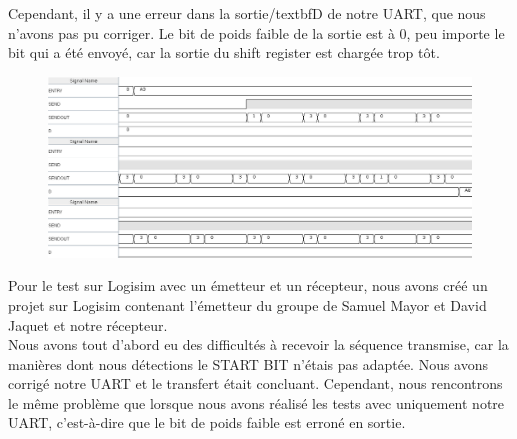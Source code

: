 \documentclass[a4paper]{article} %
\begin{document}
\begin{tcolorbox}[colframe=Monokaimagenta,colback=white]

Cependant, il y a une erreur dans la sortie/textbf{D} de notre UART, que nous n'avons pas pu corriger. Le bit de poids faible de la sortie est à 0, peu importe le bit qui a été envoyé, car la sortie du shift register est chargée trop tôt.\\
\begin{figure}[H]
\centering
    \includegraphics[width=1\textwidth]{src/CHRONO_EMISSION.png}
    \label{fig:chrono_emetteur}
\end{figure}
Pour le test sur Logisim avec un émetteur et un récepteur, nous avons créé un projet sur Logisim contenant l'émetteur du groupe de Samuel Mayor et David Jaquet et notre récepteur.\\
Nous avons tout d'abord eu des difficultés à recevoir la séquence transmise, car la manières dont nous détections le START BIT n'étais pas adaptée. Nous avons corrigé notre UART et le transfert était concluant. Cependant, nous rencontrons le même problème que lorsque nous avons réalisé les tests avec uniquement notre UART, c'est-à-dire que le bit de poids faible est erroné en sortie.
\end{tcolorbox}
\end{document}
